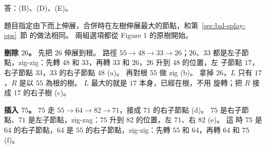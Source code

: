 答：(B)、(D)、(E)。

題目指定由下而上伸展，合併時在左樹伸展最大的節點，和第~\ref{sec:bal-splay-ops}~節
的做法相同。 兩組選項都從 Figure 1 的原樹開始。

\textbf{刪除 $26$。} 先把 $26$ 伸展到根。 路徑 $55 \to 48 \to 33 \to 26$；$26$、$33$
都是左子節點，zig-zig：先轉 $48$ 和 $33$，再轉 $33$ 和 $26$，$26$ 升到 $48$ 的位置，左
子節點 $17$，右子節點 $33$，$33$ 的右子節點 $48$ (a)。 再對根 $55$ 做 zig (b)。 拿掉
$26$，$L$ 只有 $17$，$R$ 是以 $55$ 為根的樹。 $L$ 最大的就是 $17$ 本身，已經在根，不用
旋轉；把 $R$ 接成 $17$ 的右子樹 (c)。

\textbf{插入 $75$。} $75$ 走 $55 \to 64 \to 82 \to 71$，接成 $71$ 的右子節點 (d)。 $75$
是右子節點、$71$ 是左子節點，zig-zag：$75$ 升到 $82$ 的位置，左 $71$、右 $82$ (e)。 這
時 $75$ 是 $64$ 的右子節點，$64$ 是 $55$ 的右子節點，zig-zig：先轉 $55$ 和 $64$，再轉
$64$ 和 $75$ (f)。
